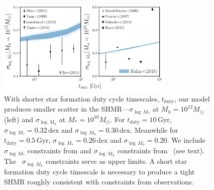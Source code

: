 \documentclass[12pt, letterpaper, preprint, tighten]{aastex}
\begin{document}

\begin{figure}
\begin{center}
\includegraphics[width=0.75\textwidth]{figs/SHMRscatter_tduty.pdf}
    \caption{With shorter star formation duty cycle timescales, $t_\mathrm{duty}$, our model
    produces smaller scatter in the SHMR---$\sigma_{\log\,M_*}$ at $M_h{=}10^{12} M_\odot$ (left) 
    and $\sigma_{\log\,M_h}$ at $M_*{=}10^{10} M_\odot$. For $t_\mathrm{duty} = 10\,\mathrm{Gyr}$, 
    $\sigma_{\log\,M_*} = 0.32\,\mathrm{dex}$ and $\sigma_{\log\,M_h} = 0.30\,\mathrm{dex}$. 
    Meanwhile for $t_\mathrm{duty} = 0.5\,\mathrm{Gyr}$, $\sigma_{\log\,M_*}= 0.26\,\mathrm{dex}$ 
    and $\sigma_{\log\,M_h} = 0.20$. We include $\sigma_{\log\,M_*}$ 
    constraints from \cite{yang2009, more2011, leauthaud2012, tinker2013, zu2015} and 
    $\sigma_{\log\,M_h}$ constraints from~\cite{mandelbaum2006, conroy2007, more2011, velander2014, han2015} 
    (see text). The~\cite{mandelbaum2006, han2015} $\sigma_{\log\,M_h}$ constraints serve as upper limits. 
    A short star formation duty cycle timescale is necessary to produce a tight SHMR roughly
    consistent with constraints from observations. 
    }
\label{fig:sigMstar_duty}
\end{center}
\end{figure}
\end{document}
